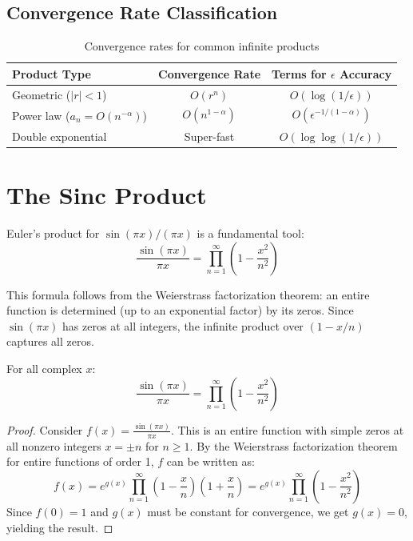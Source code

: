 \subsection{Convergence Rate Classification}

\begin{table}[H]
\centering
\begin{tabular}{l|c|c}
Product Type & Convergence Rate & Terms for $\epsilon$ Accuracy \\
\hline
Geometric ($|r|<1$) & $O(r^n)$ & $O(\log(1/\epsilon))$ \\
Power law ($a_n = O(n^{-\alpha})$) & $O(n^{1-\alpha})$ & $O(\epsilon^{-1/(1-\alpha)})$ \\
Double exponential & Super-fast & $O(\log\log(1/\epsilon))$ \\
\hline
\end{tabular}
\caption{Convergence rates for common infinite products}
\end{table}

\section{The Sinc Product}

Euler's product for $\sin(\pi x)/(\pi x)$ is a fundamental tool:
\[
\frac{\sin(\pi x)}{\pi x} = \prod_{n=1}^\infty \left(1 - \frac{x^2}{n^2}\right)
\]

This formula follows from the Weierstrass factorization theorem: an entire function is
determined (up to an exponential factor) by its zeros. Since $\sin(\pi x)$ has zeros at
all integers, the infinite product over $(1 - x/n)$ captures all zeros.

\begin{theorem}
For all complex $x$:
\[
\frac{\sin(\pi x)}{\pi x} = \prod_{n=1}^{\infty} \left(1 - \frac{x^2}{n^2}\right)
\]
\end{theorem}

\begin{proof}
Consider $f(x) = \frac{\sin(\pi x)}{\pi x}$. This is an entire function with simple zeros
at all nonzero integers $x = \pm n$ for $n \geq 1$. By the Weierstrass factorization theorem
for entire functions of order 1, $f$ can be written as:
\[
f(x) = e^{g(x)} \prod_{n=1}^{\infty} \left(1 - \frac{x}{n}\right)\left(1 + \frac{x}{n}\right)
= e^{g(x)} \prod_{n=1}^{\infty} \left(1 - \frac{x^2}{n^2}\right)
\]
Since $f(0) = 1$ and $g(x)$ must be constant for convergence, we get $g(x) = 0$, yielding
the result.
\end{proof}

